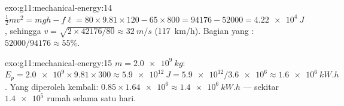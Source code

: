 \begin{solution}{exo:g11:mechanical-energy:14}
$\tfrac12 mv^2 = mgh - f\ell = 80 \times 9.81 \times 120 - 65 \times
800 = \num{94176} - \num{52000} = \qty{4.22e4}{J}$, sehingga
$v = \sqrt{2 \times \num{42176}/80} \approx \qty{32}{m/s}$
(\qty{117}{km/h}). Bagian yang :
$52000/94176 \approx 55\%$.
\end{solution}

\begin{solution}{exo:g11:mechanical-energy:15}
$m = \qty{2.0e9}{kg}$:
$E_p = \num{2.0e9} \times 9.81 \times 300 \approx \qty{5.9e12}{J}
= \num{5.9e12}/\num{3.6e6} \approx \qty{1.6e6}{kW.h}$. Yang diperoleh
kembali: $0.85 \times \num{1.64e6} \approx \qty{1.4e6}{kW.h}$ ---
sekitar $\num{1.4e5}$ rumah selama satu hari.
\end{solution}

